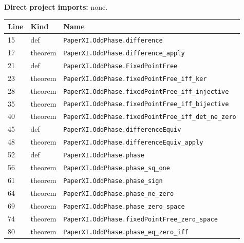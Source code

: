 \documentclass[10pt,oneside]{book}
\begin{document}
\textbf{Direct project imports:} none.

\begin{longtable}{@{}p{}p{}p{}@{}}\toprule Line&Kind&Name\\\midrule\endhead

15&def&\nolinkurl{PaperXI.OddPhase.difference}\\

17&theorem&\nolinkurl{PaperXI.OddPhase.difference_apply}\\

21&def&\nolinkurl{PaperXI.OddPhase.FixedPointFree}\\

23&theorem&\nolinkurl{PaperXI.OddPhase.fixedPointFree_iff_ker}\\

28&theorem&\nolinkurl{PaperXI.OddPhase.fixedPointFree_iff_injective}\\

35&theorem&\nolinkurl{PaperXI.OddPhase.fixedPointFree_iff_bijective}\\

40&theorem&\nolinkurl{PaperXI.OddPhase.fixedPointFree_iff_det_ne_zero}\\

45&def&\nolinkurl{PaperXI.OddPhase.differenceEquiv}\\

48&theorem&\nolinkurl{PaperXI.OddPhase.differenceEquiv_apply}\\

52&def&\nolinkurl{PaperXI.OddPhase.phase}\\

56&theorem&\nolinkurl{PaperXI.OddPhase.phase_sq_one}\\

61&theorem&\nolinkurl{PaperXI.OddPhase.phase_sign}\\

64&theorem&\nolinkurl{PaperXI.OddPhase.phase_ne_zero}\\

69&theorem&\nolinkurl{PaperXI.OddPhase.phase_zero_space}\\

74&theorem&\nolinkurl{PaperXI.OddPhase.fixedPointFree_zero_space}\\

80&theorem&\nolinkurl{PaperXI.OddPhase.phase_eq_zero_iff}\\

\bottomrule\end{longtable}
\end{document}

